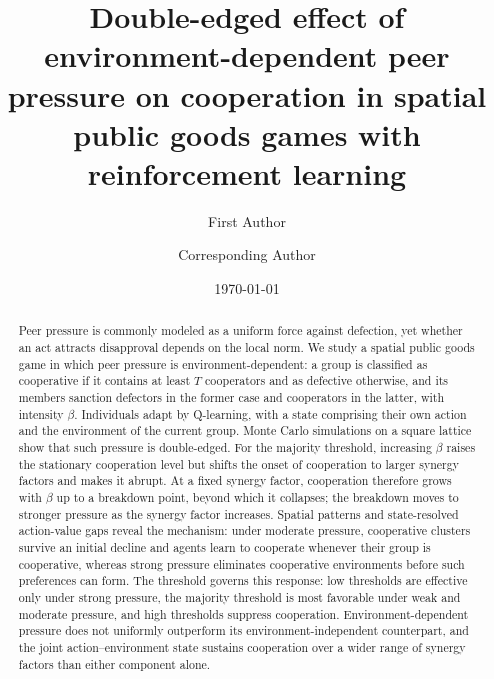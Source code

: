 \documentclass[%
  aip,cha,
  amsmath,amssymb,
  reprint,
  article-title,
]{revtex4-2}
\begin{document}
\title[Environment-dependent peer pressure with reinforcement learning]{Double-edged effect of environment-dependent peer pressure on cooperation in spatial public goods games with reinforcement learning}

\author{First Author}
\author{Corresponding Author}

\date{\today}

\begin{abstract}
Peer pressure is commonly modeled as a uniform force against defection, yet whether an act attracts disapproval depends on the local norm. We study a spatial public goods game in which peer pressure is environment-dependent: a group is classified as cooperative if it contains at least $T$ cooperators and as defective otherwise, and its members sanction defectors in the former case and cooperators in the latter, with intensity $\beta$. Individuals adapt by Q-learning, with a state comprising their own action and the environment of the current group. Monte Carlo simulations on a square lattice show that such pressure is double-edged. For the majority threshold, increasing $\beta$ raises the stationary cooperation level but shifts the onset of cooperation to larger synergy factors and makes it abrupt. At a fixed synergy factor, cooperation therefore grows with $\beta$ up to a breakdown point, beyond which it collapses; the breakdown moves to stronger pressure as the synergy factor increases. Spatial patterns and state-resolved action-value gaps reveal the mechanism: under moderate pressure, cooperative clusters survive an initial decline and agents learn to cooperate whenever their group is cooperative, whereas strong pressure eliminates cooperative environments before such preferences can form. The threshold governs this response: low thresholds are effective only under strong pressure, the majority threshold is most favorable under weak and moderate pressure, and high thresholds suppress cooperation. Environment-dependent pressure does not uniformly outperform its environment-independent counterpart, and the joint action--environment state sustains cooperation over a wider range of synergy factors than either component alone.
\end{abstract}
\end{document}
